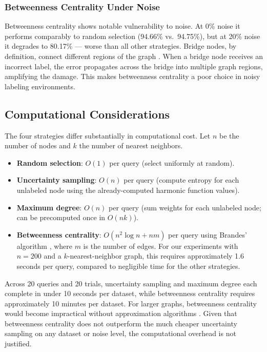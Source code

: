\documentclass[12pt]{article}
\begin{document}
\subsubsection{Betweenness Centrality Under Noise}

Betweenness centrality shows notable vulnerability to noise. At 0\% noise it performs comparably to random selection (94.66\% vs.\ 94.75\%), but at 20\% noise it degrades to 80.17\% --- worse than all other strategies. Bridge nodes, by definition, connect different regions of the graph \cite{Freeman1977}. When a bridge node receives an incorrect label, the error propagates across the bridge into multiple graph regions, amplifying the damage. This makes betweenness centrality a poor choice in noisy labeling environments.

\subsection{Computational Considerations}

The four strategies differ substantially in computational cost. Let $n$ be the number of nodes and $k$ the number of nearest neighbors.

\begin{itemize}
\item \textbf{Random selection}: $O(1)$ per query (select uniformly at random).
\item \textbf{Uncertainty sampling}: $O(n)$ per query (compute entropy for each unlabeled node using the already-computed harmonic function values).
\item \textbf{Maximum degree}: $O(n)$ per query (sum weights for each unlabeled node; can be precomputed once in $O(nk)$).
\item \textbf{Betweenness centrality}: $O(n^2 \log n + nm)$ per query using Brandes' algorithm \cite{Brandes2001}, where $m$ is the number of edges. For our experiments with $n = 200$ and a $k$-nearest-neighbor graph, this requires approximately 1.6 seconds per query, compared to negligible time for the other strategies.
\end{itemize}

Across 20 queries and 20 trials, uncertainty sampling and maximum degree each complete in under 10 seconds per dataset, while betweenness centrality requires approximately 10 minutes per dataset. For larger graphs, betweenness centrality would become impractical without approximation algorithms \cite{Brandes2001}. Given that betweenness centrality does not outperform the much cheaper uncertainty sampling on any dataset or noise level, the computational overhead is not justified.
\end{document}
